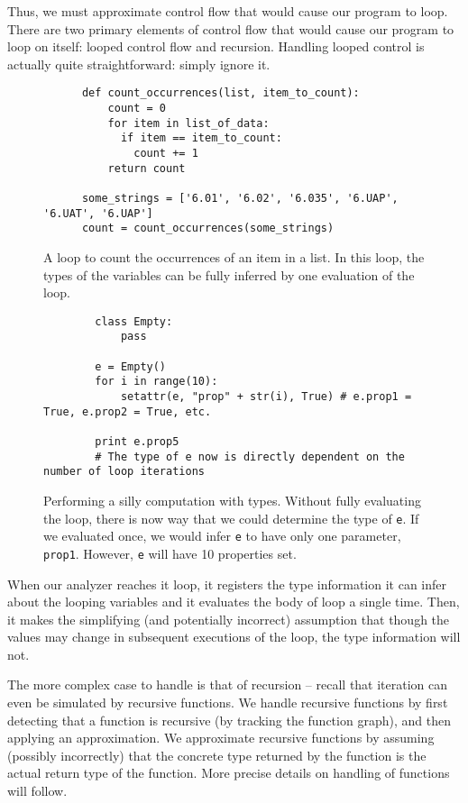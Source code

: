 \documentclass{article}[12pt]
\begin{document}
Thus, we must approximate control flow that would cause our program to loop. There are two primary
elements of control flow that would cause our program to loop on itself: looped control flow and
recursion. Handling looped control is actually quite straightforward: simply ignore it.
\begin{figure}
    \begin{verbatim}
      def count_occurrences(list, item_to_count):
          count = 0
          for item in list_of_data:
            if item == item_to_count: 
              count += 1
          return count
      
      some_strings = ['6.01', '6.02', '6.035', '6.UAP', '6.UAT', '6.UAP']
      count = count_occurrences(some_strings)

  \end{verbatim}
  \caption{
      A loop to count the occurrences of an item in a list. In this loop, the types of the
      variables can be fully inferred by one evaluation of the loop.
  }
\end{figure}


\begin{figure}
    \begin{verbatim}
        class Empty:
            pass

        e = Empty()
        for i in range(10):
            setattr(e, "prop" + str(i), True) # e.prop1 = True, e.prop2 = True, etc.

        print e.prop5
        # The type of e now is directly dependent on the number of loop iterations
    \end{verbatim}
    \caption{
        Performing a silly computation with types. Without fully evaluating the loop, there is now
        way that we could determine the type of \texttt{e}. If we evaluated once, we would infer
        \texttt{e} to have only one parameter, \texttt{prop1}. However, \texttt{e} will have 10
        properties set.  
     } \end{figure}
When our analyzer reaches it loop, it registers the type information it can infer about the looping
variables and it evaluates the body of loop a single time. Then, it makes the simplifying (and
potentially incorrect) assumption that though the values may change in subsequent executions of the
loop, the type information will not.

The more complex case to handle is that of recursion -- recall that iteration can even be simulated
by recursive functions. We handle recursive functions by first detecting that a function is
recursive (by tracking the function graph), and then applying an approximation. We approximate
recursive functions by assuming (possibly incorrectly) that the concrete type returned by the
function is the actual return type of the function. More precise details on handling of functions
will follow.
\end{document}

